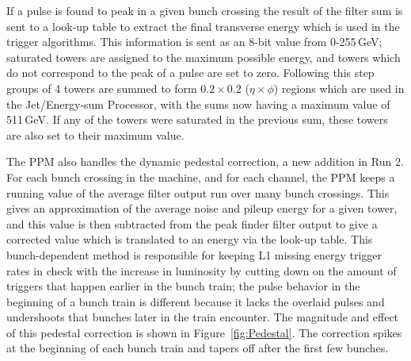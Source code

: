If a pulse is found to peak in a given bunch crossing the result of the filter sum is sent to a look-up table to extract the final transverse energy which is used in the trigger algorithms.  This information is sent as an 8-bit value from 0-255\,GeV; saturated towers are assigned to the maximum possible energy, and towers which do not correspond to the peak of a pulse are set to zero.  Following this step groups of 4 towers are summed to form $0.2\times0.2$ ($\eta\times\phi$) regions which are used in the Jet/Energy-sum Processor, with the sums now having a maximum value of 511\,GeV.  If any of the towers were saturated in the previous sum, these towers are also set to their maximum value.

The PPM also handles the dynamic pedestal correction, a new addition in Run 2.  For each bunch crossing in the machine, and for each channel, the PPM keeps a running value of the average filter output run over many bunch crossings.  This gives an approximation of the average noise and pileup energy for a given tower, and this value is then subtracted from the peak finder filter output to give a corrected value which is translated to an energy via the look-up table.  This bunch-dependent method is responsible for keeping L1 missing energy trigger rates in check with the increase in luminosity by cutting down on the amount of triggers that happen earlier in the bunch train; the pulse behavior in the beginning of a bunch train is different because it lacks the overlaid pulses and undershoots that bunches later in the train encounter.  The magnitude and effect of this pedestal correction is shown in Figure~\ref{fig:Pedestal}.  The correction spikes at the beginning of each bunch train and tapers off after the first few bunches.

